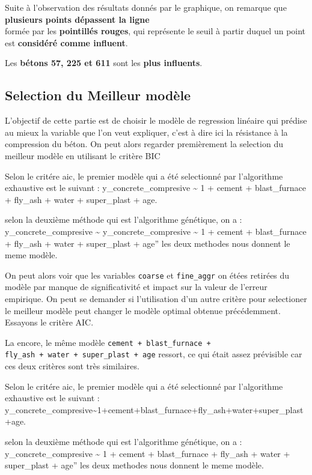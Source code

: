 \documentclass[
  12pt,
]{article}
\begin{document}
Suite à l'observation des résultats donnés par le graphique, on remarque
que \textbf{plusieurs points dépassent la ligne}\\
formée par les \textbf{pointillés rouges}, qui représente le seuil à
partir duquel un point est \textbf{considéré comme influent}.

Les \textbf{bétons 57, 225 et 611} sont les \textbf{plus influents}.

\subsection{Selection du Meilleur
modèle}\label{selection-du-meilleur-moduxe8le}

L'objectif de cette partie est de choisir le modèle de regression
linéaire qui prédise au mieux la variable que l'on veut expliquer, c'est
à dire ici la résistance à la compression du béton. On peut alors
regarder premièrement la selection du meilleur modèle en utilisant le
critère BIC

Selon le critére aic, le premier modèle qui a été selectionné par
l'algorithme exhaustive est le suivant : y\_concrete\_compresive
\textasciitilde{} 1 + cement + blast\_furnace + fly\_ash + water +
super\_plast + age.

selon la deuxième méthode qui est l'algorithme génétique, on a :
y\_concrete\_compresive \textasciitilde{} y\_concrete\_compresive
\textasciitilde{} 1 + cement + blast\_furnace + fly\_ash + water +
super\_plast + age'' les deux methodes nous donnent le meme modèle.

On peut alors voir que les variables \texttt{coarse} et
\texttt{fine\_aggr} on étées retirées du modèle par manque de
significativité et impact sur la valeur de l'erreur empirique. On peut
se demander si l'utilisation d'un autre critère pour selectioner le
meilleur modèle peut changer le modèle optimal obtenue précédemment.
Essayons le critère AIC.

La encore, le même modèle \texttt{cement\ +\ blast\_furnace\ +}
\texttt{fly\_ash\ +\ water\ +\ super\_plast\ +\ age} ressort, ce qui
était assez prévisible car ces deux critères sont très similaires.

Selon le critére aic, le premier modèle qui a été selectionné par
l'algorithme exhaustive est le suivant :
y\_concrete\_compresive\textasciitilde1+cement+blast\_furnace+fly\_ash+water+super\_plast+age.

selon la deuxième méthode qui est l'algorithme génétique, on a :
y\_concrete\_compresive \textasciitilde{} 1 + cement + blast\_furnace +
fly\_ash + water + super\_plast + age'' les deux methodes nous donnent
le meme modèle.
\end{document}
